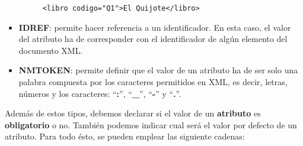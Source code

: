 \begin{itemize}
\begin{figure}[H]
\begin{tcolorbox}[sharp corners, colback=yellow!30, colframe=white!20]
\begin{verbatim}
<libro codigo="Q1">El Quijote</libro>
            \end{verbatim}
        \end{tcolorbox}
    \end{figure}

    \item \textbf{IDREF}: permite hacer referencia a un identificador. En esta caso, el valor del atributo ha de corresponder con el identificador de algún elemento del documento XML.

    \item \textbf{NMTOKEN}: permite definir que el valor de un atributo ha de ser solo una palabra compuesta por los caracteres permitidos en XML, es decir, letras, números y los caracteres: ``\textbf{:}'', ``\textbf{\_}'', ``\textbf{-}'' y ``\textbf{.}''.
\end{itemize}

Además de estos tipos, debemos declarar si el valor de un \textbf{atributo} es \textbf{obligatorio} o no. También podemos indicar cual será el valor por defecto de un atributo. Para todo ésto, se pueden emplear las siguiente cadenas:

